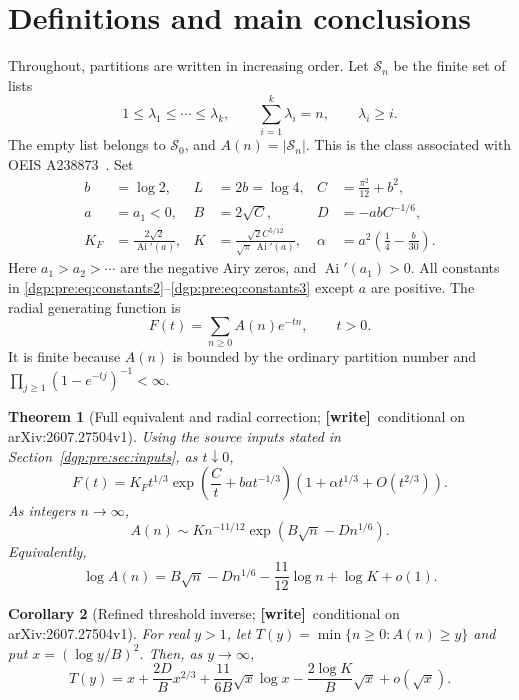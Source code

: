 \documentclass[11pt,letterpaper]{article}
\numberwithin{equation}{section}
\newtheorem{theorem}{Theorem}[section]
\newtheorem{corollary}[theorem]{Corollary}
\theoremstyle{remark}\newtheorem{remark}[theorem]{Remark}
\newcommand{\Ai}{\operatorname{Ai}}
\newcommand{\wtag}{\textup{\textbf{[write]}}}
\begin{document}
\section{Definitions and main conclusions}\label{dgp:pre:sec:main}
Throughout, partitions are written in increasing order. Let
$\mathcal S_n$ be the finite set of lists
\[
 1\leq\lambda_1\leq\cdots\leq\lambda_k,\qquad
 \sum_{i=1}^k\lambda_i=n,\qquad \lambda_i\geq i.
\]
The empty list belongs to $\mathcal S_0$, and $A(n)=|\mathcal S_n|$.
This is the class associated with OEIS A238873~\cite{oeisA238873}.
Set
\begin{align}
 b&=\log2, & L&=2b=\log4, & C&=\frac{\pi^2}{12}+b^2,\label{dgp:pre:eq:constants1}\\
 a&=a_1<0, & B&=2\sqrt C, & D&=-abC^{-1/6},\label{dgp:pre:eq:constants2}\\
 K_F&=\frac{2\sqrt2}{\Ai'(a)},&
 K&=\frac{\sqrt2 C^{5/12}}{\sqrt\pi\,\Ai'(a)},&
 \alpha&=a^2\left(\frac14-\frac b{30}\right).
 \label{dgp:pre:eq:constants3}
\end{align}
Here $a_1>a_2>\cdots$ are the negative Airy zeros, and
$\Ai'(a_1)>0$. All constants in \eqref{dgp:pre:eq:constants2}--\eqref{dgp:pre:eq:constants3}
except $a$ are positive. The radial generating function is
\[
 F(t)=\sum_{n\geq0}A(n)e^{-tn},\qquad t>0.
\]
It is finite because $A(n)$ is bounded by the ordinary partition
number and $\prod_{j\geq1}(1-e^{-tj})^{-1}<\infty$.

\begin{theorem}[Full equivalent and radial correction; \wtag\ conditional on arXiv:2607.27504v1]\label{dgp:pre:thm:main}
Using the source inputs stated in Section~\ref{dgp:pre:sec:inputs}, as $t\downarrow0$,
\begin{equation}
 F(t)=K_F t^{1/3}\exp\left(\frac Ct+ba t^{-1/3}\right)
       \left(1+\alpha t^{1/3}+O(t^{2/3})\right).
 \label{dgp:pre:eq:radial}
\end{equation}
As integers $n\to\infty$,
\begin{equation}
 A(n)\sim K n^{-11/12}\exp\left(B\sqrt n-Dn^{1/6}\right).
 \label{dgp:pre:eq:equivalent}
\end{equation}
Equivalently,
\begin{equation}
 \log A(n)=B\sqrt n-Dn^{1/6}-\frac{11}{12}\log n+\log K+o(1).
 \label{dgp:pre:eq:logequivalent}
\end{equation}
\end{theorem}

\begin{corollary}[Refined threshold inverse; \wtag\ conditional on arXiv:2607.27504v1]\label{dgp:pre:cor:inverse}
For real $y>1$, let $T(y)=\min\{n\geq0:A(n)\geq y\}$ and put
$x=(\log y/B)^2$. Then, as $y\to\infty$,
\begin{equation}
 T(y)=x+\frac{2D}{B}x^{2/3}
       +\frac{11}{6B}\sqrt x\log x
       -\frac{2\log K}{B}\sqrt x+o(\sqrt x).
 \label{dgp:pre:eq:inverse}
\end{equation}
\end{corollary}
\end{document}

